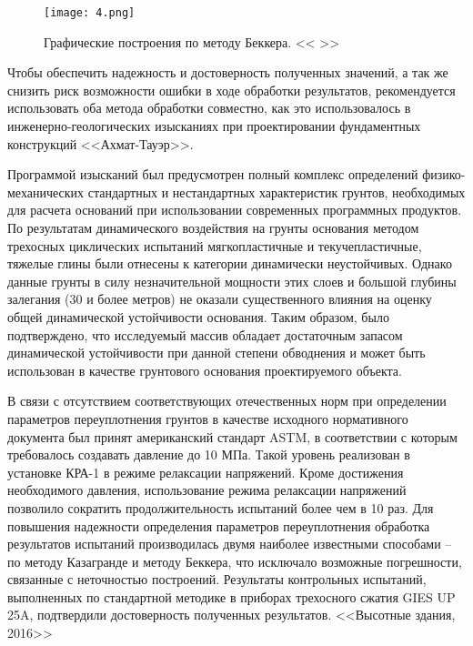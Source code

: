 \begin{figure}[ht]
  \texttt{[image: 4.png]}
  \caption{Графические построения по методу Беккера. <<\cite{morin_work_1988} >>}
\end{figure}
  
  Чтобы обеспечить надежность и достоверность полученных значений, а так же снизить риск возможности ошибки в ходе обработки результатов, рекомендуется использовать оба метода обработки совместно, как это использовалось в инженерно-геологических изысканиях при проектировании фундаментных конструкций <<Ахмат-Тауэр>>. 

  Программой изысканий был предусмотрен полный комплекс определений физико-механических стандартных и нестандартных характеристик грунтов, необходимых для расчета оснований при использовании современных программных продуктов. По результатам динамического воздействия на грунты основания методом трехосных циклических испытаний мягкопластичные и текучепластичные, тяжелые глины были отнесены к категории динамически неустойчивых. Однако данные грунты в силу незначительной мощности этих слоев и большой глубины залегания (30 и более метров) не оказали существенного влияния на оценку общей динамической устойчивости основания. Таким образом, было подтверждено, что исследуемый массив обладает достаточным запасом динамической устойчивости при данной степени обводнения и может быть использован в качестве грунтового основания проектируемого объекта.

В связи с отсутствием соответствующих отечественных норм при определении параметров переуплотнения грунтов в качестве исходного нормативного документа был принят американский стандарт ASTM, в соответствии с которым требовалось создавать давление до 10 МПа. Такой уровень реализован в установке КРА-1 в режиме релаксации напряжений. Кроме достижения необходимого давления, использование режима релаксации напряжений позволило сократить продолжительность испытаний более чем в 10 раз. 
Для повышения надежности определения параметров переуплотнения обработка результатов испытаний производилась двумя наиболее известными способами – по методу Казагранде и методу Беккера, что исключало возможные погрешности, связанные с неточностью построений. Результаты контрольных испытаний, выполненных по стандартной методике в приборах трехосного сжатия GIES UP 25A, подтвердили достоверность полученных результатов. <<Высотные здания, 2016>>
